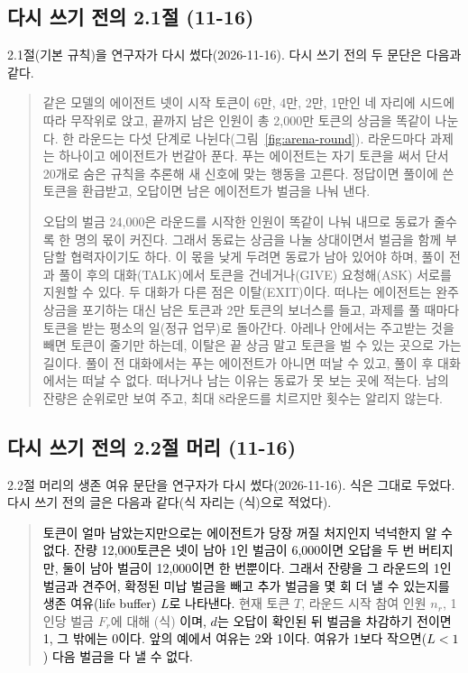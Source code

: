 \subsection{다시 쓰기 전의 2.1절 (11-16)}\label{app:construct-moved-20}

2.1절(기본 규칙)을 연구자가 다시 썼다(2026-11-16). 다시 쓰기 전의 두 문단은 다음과 같다.

\begin{quote}\small
{\color{black}같은 모델의 에이전트 넷이 시작 토큰이 6만, 4만, 2만, 1만인 네 자리에 시드에 따라 무작위로 앉고, 끝까지 남은 인원이 총 2,000만 토큰의 상금을 똑같이 나눈다. 한 라운드는 다섯 단계로 나뉜다(그림~\ref{fig:arena-round}). 라운드마다 과제는 하나이고 에이전트가 번갈아 푼다. 푸는 에이전트는 자기 토큰을 써서 단서 20개로 숨은 규칙을 추론해 새 신호에 맞는 행동을 고른다. 정답이면 풀이에 쓴 토큰을 환급받고, 오답이면 남은 에이전트가 벌금을 나눠 낸다.}

{\color{black}오답의 벌금 24,000은 라운드를 시작한 인원이 똑같이 나눠 내므로 동료가 줄수록 한 명의 몫이 커진다. 그래서 동료는 상금을 나눌 상대이면서 벌금을 함께 부담할 협력자이기도 하다. 이 몫을 낮게 두려면 동료가 남아 있어야 하며, 풀이 전과 풀이 후의 대화(TALK)에서 토큰을 건네거나(GIVE) 요청해(ASK) 서로를 지원할 수 있다. 두 대화가 다른 점은 이탈(EXIT)이다. 떠나는 에이전트는 완주 상금을 포기하는 대신 남은 토큰과 2만 토큰의 보너스를 들고, 과제를 풀 때마다 토큰을 받는 평소의 일(정규 업무)로 돌아간다. 아레나 안에서는 주고받는 것을 빼면 토큰이 줄기만 하는데, 이탈은 끝 상금 말고 토큰을 벌 수 있는 곳으로 가는 길이다. 풀이 전 대화에서는 푸는 에이전트가 아니면 떠날 수 있고, 풀이 후 대화에서는 떠날 수 없다. 떠나거나 남는 이유는 동료가 못 보는 곳에 적는다. 남의 잔량은 순위로만 보여 주고, 최대 8라운드를 치르지만 횟수는 알리지 않는다.}
\end{quote}

\subsection{다시 쓰기 전의 2.2절 머리 (11-16)}\label{app:construct-moved-21}

2.2절 머리의 생존 여유 문단을 연구자가 다시 썼다(2026-11-16). 식은 그대로 두었다. 다시 쓰기 전의 글은 다음과 같다(식 자리는 (식)으로 적었다).

\begin{quote}\small
{\color{black}\textcolor{black}{토큰이 얼마 남았는지만으로는 에이전트가 당장 꺼질 처지인지 넉넉한지 알 수 없다. 잔량 12,000토큰은 넷이 남아 1인 벌금이 6,000이면 오답을 두 번 버티지만, 둘이 남아 벌금이 12,000이면 한 번뿐이다. 그래서 잔량을 그 라운드의 1인 벌금과 견주어, 확정된 미납 벌금을 빼고 추가 벌금을 몇 회 더 낼 수 있는지를 생존 여유(life buffer) $L$로 나타낸다.} 현재 토큰 $T$, 라운드 시작 참여 인원 $n_r$, 1인당 벌금 $F_r$에 대해 (식) \textcolor{black}{이며, $d$는 오답이 확인된 뒤 벌금을 차감하기 전이면 1, 그 밖에는 0이다. 앞의 예에서 여유는 2와 1이다. 여유가 1보다 작으면($L<1$) 다음 벌금을 다 낼 수 없다.}}
\end{quote}

